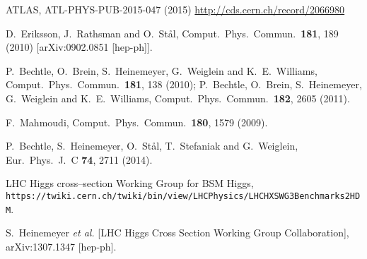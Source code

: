 ATLAS, 
ATL-PHYS-PUB-2015-047 (2015) 
\url{http://cds.cern.ch/record/2066980}






  D.~Eriksson, J.~Rathsman and O.~St{\aa}l,
  Comput.\ Phys.\ Commun.\  {\bf 181}, 189 (2010)
  [arXiv:0902.0851 [hep-ph]].

  P.~Bechtle, O.~Brein, S.~Heinemeyer, G.~Weiglein and K.~E.~Williams,
  Comput.\ Phys.\ Commun.\  {\bf 181}, 138 (2010);
  P.~Bechtle, O.~Brein, S.~Heinemeyer, G.~Weiglein and K.~E.~Williams,
  Comput.\ Phys.\ Commun.\  {\bf 182}, 2605 (2011).

  F.~Mahmoudi,
  Comput.\ Phys.\ Commun.\  {\bf 180}, 1579 (2009).

  P.~Bechtle, S.~Heinemeyer, O.~St{\aa}l, T.~Stefaniak and G.~Weiglein,
  Eur.\ Phys.\ J.\ C {\bf 74}, 2711 (2014).

 LHC Higgs cross--section Working Group for BSM Higgs, \\
  \texttt{https://twiki.cern.ch/twiki/bin/view/LHCPhysics/LHCHXSWG3Benchmarks2HDM}.

  S.~Heinemeyer {\it et al.} [LHC Higgs Cross Section Working Group Collaboration],
  arXiv:1307.1347 [hep-ph].


